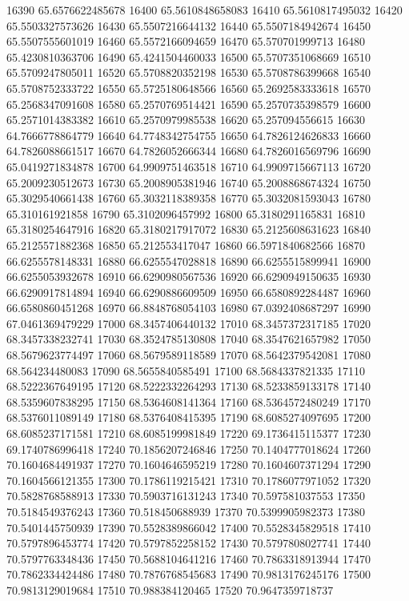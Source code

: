 {16390 65.6576622485678
16400 65.5610848658083
16410 65.5610817495032
16420 65.5503327573626
16430 65.5507216644132
16440 65.5507184942674
16450 65.5507555601019
16460 65.5572166094659
16470 65.570701999713
16480 65.4230810363706
16490 65.4241504460033
16500 65.5707351068669
16510 65.5709247805011
16520 65.5708820352198
16530 65.5708786399668
16540 65.5708752333722
16550 65.5725180648566
16560 65.2692583333618
16570 65.2568347091608
16580 65.2570769514421
16590 65.2570735398579
16600 65.2571014383382
16610 65.2570979985538
16620 65.257094556615
16630 64.7666778864779
16640 64.7748342754755
16650 64.7826124626833
16660 64.7826088661517
16670 64.7826052666344
16680 64.7826016569796
16690 65.0419271834878
16700 64.9909751463518
16710 64.9909715667113
16720 65.2009230512673
16730 65.2008905381946
16740 65.2008868674324
16750 65.3029540661438
16760 65.3032118389358
16770 65.3032081593043
16780 65.310161921858
16790 65.3102096457992
16800 65.3180291165831
16810 65.3180254647916
16820 65.3180217917072
16830 65.2125608631623
16840 65.2125571882368
16850 65.212553417047
16860 66.5971840682566
16870 66.6255578148331
16880 66.6255547028818
16890 66.6255515899941
16900 66.6255053932678
16910 66.6290980567536
16920 66.6290949150635
16930 66.6290917814894
16940 66.6290886609509
16950 66.6580892284487
16960 66.6580860451268
16970 66.8848768054103
16980 67.0392408687297
16990 67.0461369479229
17000 68.3457406440132
17010 68.3457372317185
17020 68.3457338232741
17030 68.3524785130808
17040 68.3547621657982
17050 68.5679623774497
17060 68.5679589118589
17070 68.5642379542081
17080 68.564234480083
17090 68.5655840585491
17100 68.5684337821335
17110 68.5222367649195
17120 68.5222332264293
17130 68.5233859133178
17140 68.5359607838295
17150 68.5364608141364
17160 68.5364572480249
17170 68.5376011089149
17180 68.5376408415395
17190 68.6085274097695
17200 68.6085237171581
17210 68.6085199981849
17220 69.1736415115377
17230 69.1740786996418
17240 70.1856207246846
17250 70.1404777018624
17260 70.1604684491937
17270 70.1604646595219
17280 70.1604607371294
17290 70.1604566121355
17300 70.1786119215421
17310 70.1786077971052
17320 70.5828768588913
17330 70.5903716131243
17340 70.597581037553
17350 70.5184549376243
17360 70.518450688939
17370 70.5399905982373
17380 70.5401445750939
17390 70.5528389866042
17400 70.5528345829518
17410 70.5797896453774
17420 70.5797852258152
17430 70.5797808027741
17440 70.5797763348436
17450 70.5688104641216
17460 70.7863318913944
17470 70.7862334424486
17480 70.7876768545683
17490 70.9813176245176
17500 70.9813129019684
17510 70.988384120465
17520 70.9647359718737
}
